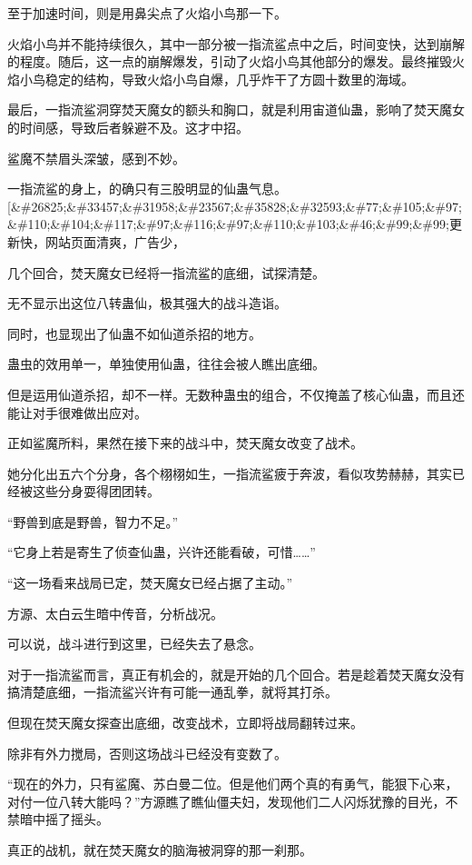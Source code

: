 \begin{this_body}
至于加速时间，则是用鼻尖点了火焰小鸟那一下。

火焰小鸟并不能持续很久，其中一部分被一指流鲨点中之后，时间变快，达到崩解的程度。随后，这一点的崩解爆发，引动了火焰小鸟其他部分的爆发。最终摧毁火焰小鸟稳定的结构，导致火焰小鸟自爆，几乎炸干了方圆十数里的海域。

最后，一指流鲨洞穿焚天魔女的额头和胸口，就是利用宙道仙蛊，影响了焚天魔女的时间感，导致后者躲避不及。这才中招。

鲨魔不禁眉头深皱，感到不妙。

一指流鲨的身上，的确只有三股明显的仙蛊气息。[\&\#26825;\&\#33457;\&\#31958;\&\#23567;\&\#35828;\&\#32593;\&\#77;\&\#105;\&\#97;\&\#110;\&\#104;\&\#117;\&\#97;\&\#116;\&\#97;\&\#110;\&\#103;\&\#46;\&\#99;\&\#99;更新快，网站页面清爽，广告少，

几个回合，焚天魔女已经将一指流鲨的底细，试探清楚。

无不显示出这位八转蛊仙，极其强大的战斗造诣。

同时，也显现出了仙蛊不如仙道杀招的地方。

蛊虫的效用单一，单独使用仙蛊，往往会被人瞧出底细。

但是运用仙道杀招，却不一样。无数种蛊虫的组合，不仅掩盖了核心仙蛊，而且还能让对手很难做出应对。

正如鲨魔所料，果然在接下来的战斗中，焚天魔女改变了战术。

她分化出五六个分身，各个栩栩如生，一指流鲨疲于奔波，看似攻势赫赫，其实已经被这些分身耍得团团转。

“野兽到底是野兽，智力不足。”

“它身上若是寄生了侦查仙蛊，兴许还能看破，可惜……”

“这一场看来战局已定，焚天魔女已经占据了主动。”

方源、太白云生暗中传音，分析战况。

可以说，战斗进行到这里，已经失去了悬念。

对于一指流鲨而言，真正有机会的，就是开始的几个回合。若是趁着焚天魔女没有搞清楚底细，一指流鲨兴许有可能一通乱拳，就将其打杀。

但现在焚天魔女探查出底细，改变战术，立即将战局翻转过来。

除非有外力搅局，否则这场战斗已经没有变数了。

“现在的外力，只有鲨魔、苏白曼二位。但是他们两个真的有勇气，能狠下心来，对付一位八转大能吗？”方源瞧了瞧仙僵夫妇，发现他们二人闪烁犹豫的目光，不禁暗中摇了摇头。

真正的战机，就在焚天魔女的脑海被洞穿的那一刹那。


\end{this_body}
